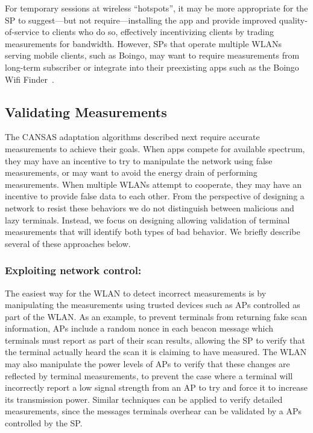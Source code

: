 For temporary sessions at wireless ``hotspots'', it may be more appropriate
for the SP to suggest---but not require---installing the \PS{} app
and provide improved quality-of-service to clients who do so, effectively
incentivizing clients by trading measurements for bandwidth. However, SPs
that operate multiple WLANs serving mobile clients, such as Boingo, may want
to require measurements from long-term subscriber or integrate \PS{}
into their preexisting apps such as the Boingo Wifi
Finder~\cite{boingo-playstore-url}.

\subsection{Validating Measurements}
\label{subsec-validation}

The CANSAS adaptation algorithms described next require accurate measurements
to achieve their goals. When apps compete for available spectrum, they may
have an incentive to try to manipulate the network using false measurements,
or may want to avoid the energy drain of performing measurements. When
multiple WLANs attempt to cooperate, they may have an incentive to provide
false data to each other. From the perspective of designing a network to
resist these behaviors we do not distinguish between malicious and lazy
terminals. Instead, we focus on designing \PS{} allowing validation
of terminal measurements that will identify both types of bad behavior. We
briefly describe several of these approaches below.

\subsubsection{Exploiting network control:\space} The easiest way for the
WLAN to detect incorrect measurements is by manipulating the
measurements using trusted devices such as APs controlled as part of
the WLAN. As an example, to prevent terminals from returning fake scan
information, \PS{} APs include a random nonce in each beacon
message which terminals must report as part of their scan results,
allowing the SP to verify that the terminal actually heard the scan it
is claiming to have measured. The WLAN may also manipulate the power
levels of APs to verify that these changes are reflected by terminal
measurements, to prevent the case where a terminal will incorrectly
report a low signal strength from an AP to try and force it to
increase its transmission power. Similar techniques can be applied to
verify detailed measurements, since the messages terminals overhear
can be validated by a APs controlled by the SP.

